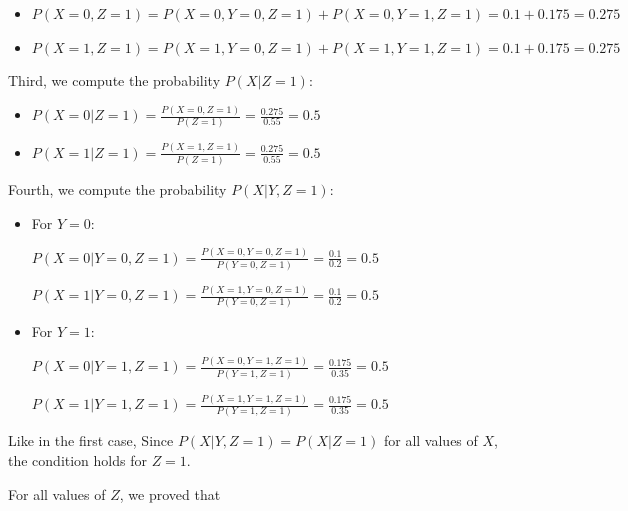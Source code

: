 \documentclass[12pt,letterpaper, onecolumn]{exam}
\begin{document}
\begin{questions}
\begin{parts}
\begin{subparts}
\begin{solution}
                \begin{itemize}
                    \item $P(X=0, Z=1) = P(X=0, Y=0, Z=1) + P(X=0, Y=1, Z=1) = 0.1 + 0.175 = 0.275$
                    \item $P(X=1, Z=1) = P(X=1, Y=0, Z=1) + P(X=1, Y=1, Z=1) = 0.1 + 0.175 = 0.275$
                \end{itemize}

                Third, we compute the probability $P(X|Z=1)$:

                \begin{itemize}
                    \item $\displaystyle{P(X=0|Z=1) = \frac{P(X=0, Z=1)}{P(Z=1)} = \frac{0.275}{0.55} = 0.5}$
                    \item $\displaystyle{P(X=1|Z=1) = \frac{P(X=1, Z=1)}{P(Z=1)} = \frac{0.275}{0.55} = 0.5}$
                \end{itemize}

                Fourth, we compute the probability $P(X|Y, Z=1)$:

                \begin{itemize}
                    \item For $Y=0$:
                    \begin{center}
                    $\displaystyle{P(X=0|Y=0, Z=1) = \frac{P(X=0, Y=0, Z=1)}{P(Y=0, Z=1)} = \frac{0.1}{0.2} = 0.5}$

                    $\displaystyle{P(X=1|Y=0, Z=1) = \frac{P(X=1, Y=0, Z=1)}{P(Y=0, Z=1)} = \frac{0.1}{0.2} = 0.5}$
                    \end{center}

                    \item For $Y=1$:
                    \begin{center}
                    $\displaystyle{P(X=0|Y=1, Z=1) = \frac{P(X=0, Y=1, Z=1)}{P(Y=1, Z=1)} = \frac{0.175}{0.35} = 0.5}$

                    $\displaystyle{P(X=1|Y=1, Z=1) = \frac{P(X=1, Y=1, Z=1)}{P(Y=1, Z=1)} = \frac{0.175}{0.35} = 0.5}$
                    \end{center}
                \end{itemize}

                Like in the first case, Since $P(X|Y, Z=1) = P(X|Z=1)$ for all values of $X$, the condition holds for $Z=1$.

                For all values of $Z$, we proved that 


\end{solution}
\end{subparts}
\end{parts}
\end{questions}
\end{document}
